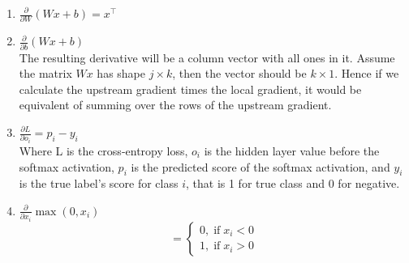 \documentclass{article}
\begin{document}
        \begin{enumerate}
            \item $\frac{\partial}{\partial{W}} (Wx +b) = x^{\intercal}$
            \item $\frac{\partial}{\partial{b}} (Wx +b)$ \\
                The resulting derivative will be a column vector with all ones
                in it. Assume the matrix $Wx$ has shape $j \times k$, then the 
                vector should be $k \times 1$. Hence if we calculate the upstream 
                gradient times the local gradient, it would be equivalent of 
                summing over the rows of the upstream gradient.
            \item $\frac{\partial{L}}{\partial{o_i}} = p_i - y_i$ \\
                Where L is the cross-entropy loss, $o_i$ is the hidden layer value
                before the softmax activation, $p_i$ is the predicted score of 
                the softmax activation, and $y_i$ is the true label's score for
                class $i$, that is 1 for true class and 0 for negative.
            \item $\frac{\partial}{\partial{x_i}}\max{(0, x_i)}$
                \[
                    = 
                    \begin{cases}
                        0, \; \text{if} \; x_i < 0 \\
                        1, \; \text{if} \; x_i > 0
                    \end{cases}
                \]
        \end{enumerate}
\end{document}
